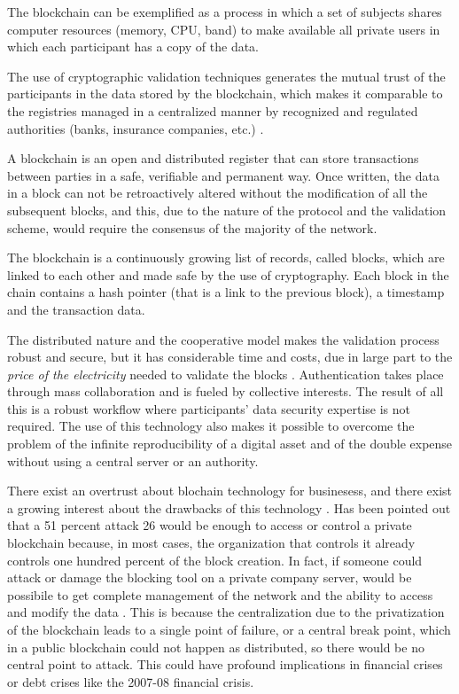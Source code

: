 \documentclass[]{book}
\begin{document}
The blockchain can be exemplified as a process in which a set of
subjects shares computer resources (memory, CPU, band) to make available
all private users in which each participant has a copy of the data.

The use of cryptographic validation techniques generates the mutual
trust of the participants in the data stored by the blockchain, which
makes it comparable to the registries managed in a centralized manner by
recognized and regulated authorities (banks, insurance companies, etc.)
\citep{pilkington201611}.

A blockchain is an open and distributed register that can store
transactions between parties in a safe, verifiable and permanent way.
Once written, the data in a block can not be retroactively altered
without the modification of all the subsequent blocks, and this, due to
the nature of the protocol and the validation scheme, would require the
consensus of the majority of the network. \citep{iansiti2017truth}

The blockchain is a continuously growing list of records, called blocks,
which are linked to each other and made safe by the use of cryptography.
Each block in the chain contains a hash pointer (that is a link to the
previous block), a timestamp and the transaction data.

The distributed nature and the cooperative model makes the validation
process robust and secure, but it has considerable time and costs, due
in large part to the \emph{price of the electricity} needed to validate
the blocks \citep{underwood2016blockchain}. Authentication takes place
through mass collaboration and is fueled by collective interests. The
result of all this is a robust workflow where participants' data
security expertise is not required. The use of this technology also
makes it possible to overcome the problem of the infinite
reproducibility of a digital asset and of the double expense without
using a central server or an authority. \citep{karame2012double}

There exist an overtrust about blochain technology for businesess, and
there exist a growing interest about the drawbacks of this technology
\citep[\citet{lin2017survey}, \citet{yli2016current}]{eyal2018majority}.
Has been pointed out that a 51 percent attack 26 would be enough to
access or control a private blockchain because, in most cases, the
organization that controls it already controls one hundred percent of
the block creation. In fact, if someone could attack or damage the
blocking tool on a private company server, would be possibile to get
complete management of the network and the ability to access and modify
the data \citep{hampton2016understanding}. This is because the
centralization due to the privatization of the blockchain leads to a
single point of failure, or a central break point, which in a public
blockchain could not happen as distributed, so there would be no central
point to attack. This could have profound implications in financial
crises or debt crises like the 2007-08 financial crisis.
\end{document}
